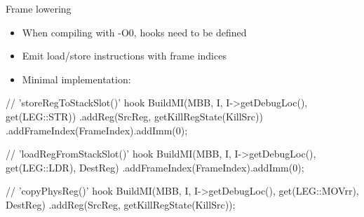 
\begin{frame}[fragile]{Frame lowering}

\begin{itemize}
    \item When compiling with  -O0, hooks need to be defined
    \item Emit load/store instructions with frame indices
    \item Minimal implementation:
\end{itemize}

\begin{codebox}
// 'storeRegToStackSlot()' hook
BuildMI(MBB, I, I->getDebugLoc(), get(LEG::STR))
  .addReg(SrcReg, getKillRegState(KillSrc))
  .addFrameIndex(FrameIndex).addImm(0);
\end{codebox}

\begin{codebox}
// 'loadRegFromStackSlot()' hook
BuildMI(MBB, I, I->getDebugLoc(), get(LEG::LDR), DestReg)
  .addFrameIndex(FrameIndex).addImm(0);
\end{codebox}

\begin{codebox}
// 'copyPhysReg()' hook
BuildMI(MBB, I, I->getDebugLoc(), get(LEG::MOVrr), DestReg)
  .addReg(SrcReg, getKillRegState(KillSrc));
\end{codebox}

\end{frame}
